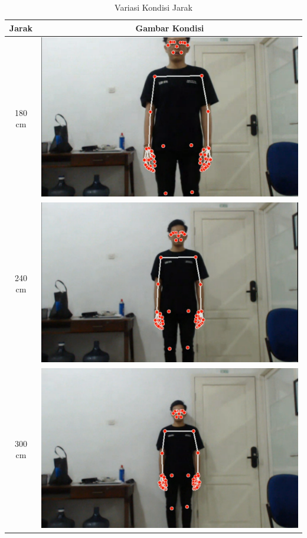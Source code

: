 \begin{longtable}{|c|c|}
  \caption{Variasi Kondisi Jarak}
  \label{tb:kondisijarak}                                   \\
  \hline
  \rowcolor[HTML]{C0C0C0}
  \textbf{Jarak} & \textbf{Gambar Kondisi}  \\
  \hline
  180 cm            &  \includegraphics[scale=0.15]{gambar/bab4-jarak300.png}                \\
  \hline
  240 cm            & \includegraphics[scale=0.15]{gambar/bab4-jarak240.png}                 \\
  \hline
  300 cm            & \includegraphics[scale=0.15]{gambar/bab4-jarak180.png}                 \\
  \hline
\end{longtable}

